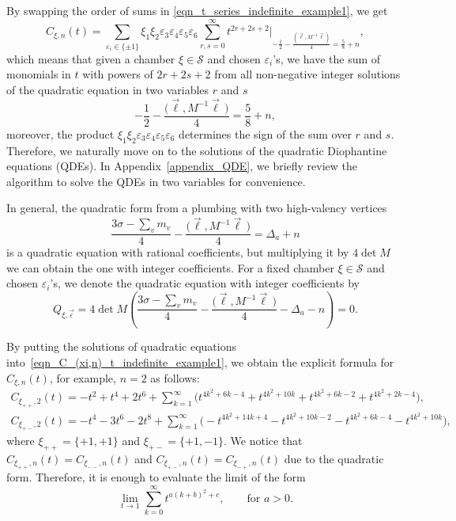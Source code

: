 \documentclass[pdftex]{sigma}
\numberwithin{equation}{section}
\begin{document}
\begin{Example}
	By swapping the order of sums in \eqref{eqn_t_series_indefinite_example1}, we get
	\begin{equation}\label{eqn_C_(xi,n)_t_indefinite_example1}
		C_{\xi,n}(t)= \sum_{\varepsilon_i\in\{\pm1\}} \xi_1\xi_2\varepsilon_3\varepsilon_4\varepsilon_5\varepsilon_6  \sum_{r,s=0}^{\infty}t^{2r+2s+2} \Big|_{-\frac{1}{2}-\frac{(\vec{\ell},M^{-1}\vec{\ell})}{4}=\frac{5}{8}+n},
	\end{equation}
	which means that given a chamber $ \xi\in \mathcal{S} $ and chosen $ \varepsilon_i $'s, we have the sum of monomials in $ t $ with powers of $ 2r+2s+2 $ from all non-negative integer solutions of the quadratic equation in two variables $ r $ and $ s $
	\[
	-\frac{1}{2}-\frac{\big(\vec{\ell},M^{-1}\vec{\ell}\,\big)}{4}=\frac{5}{8}+n,
	\]
	moreover, the product $\xi_1\xi_2\varepsilon_3\varepsilon_4\varepsilon_5\varepsilon_6$ determines the sign of the sum over $ r $ and $ s $. Therefore, we naturally move on to the solutions of the quadratic Diophantine equations (QDEs). In Appendix~\ref{appendix_QDE}, we briefly review the algorithm to solve the QDEs in two variables for convenience.
	
	In general, the quadratic form from a plumbing with two high-valency vertices
	\[
	\frac{3\sigma-\sum_v m_v}{4}-\frac{\big(\vec{\ell},M^{-1}\vec{\ell}\,\big)}{4}=\Delta_a+n
	\]
	is a quadratic equation with rational coefficients, but multiplying it by $ 4\det M $ we can obtain the one with integer coefficients. For a fixed chamber $ \xi\in \mathcal{S} $ and chosen $ \varepsilon_i $'s, we denote the quadratic equation with integer coefficients by
	\[
	Q_{\xi,\vec{\varepsilon}}=4\det M\left(\frac{3\sigma-\sum_v m_v}{4}-\frac{\big(\vec{\ell},M^{-1}\vec{\ell}\,\big)}{4}-\Delta_a-n\right)=0.
	\]
	
	By putting the solutions of quadratic equations into~\eqref{eqn_C_(xi,n)_t_indefinite_example1}, we obtain the explicit formula for~$ C_{\xi,n}(t) $, for example, $ n=2 $ as follows:
	\begin{gather}
C_{\xi_{++},2}(t) =-t^2+t^4+2t^6+\sum_{k=1}^{\infty}\big(t^{4k^2+6k-4}+t^{4k^2+10k}+t^{4k^2+6k-2}+t^{4k^2+2k-4}\big),\nonumber\\
C_{\xi_{+-},2}(t) =-t^4-3t^6-2t^8+\sum_{k=1}^{\infty}\big({-}t^{4k^2+14k+4}-t^{4k^2+10k-2}-t^{4k^2+6k-4}-t^{4k^2+10k}\big), \!\!\!\label{eqn_C_(xi,2)_t_indefinite_example1}
		\end{gather}
	where $ \xi_{++}=\{+1,+1\} $ and $ \xi_{+-}=\{+1,-1\} $. We notice that $ C_{\xi_{++},n}(t)=C_{\xi_{--},n}(t) $ and $ C_{\xi_{+-},n}(t)=C_{\xi_{-+},n}(t) $ due to the quadratic form. Therefore, it is enough to evaluate the limit of the form
	\[
	\lim_{t\rightarrow 1}\sum_{k=0}^{\infty} t^{a(k+b)^2+c}, \qquad \text{for } a>0.
	\]
	

\end{Example}
\end{document}
